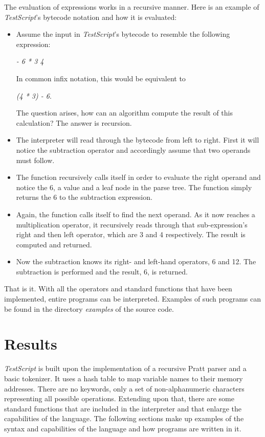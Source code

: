 \documentclass[12pt,a4paper]{article}
\newcommand{\expr}[1] {
    \begin{center}
        #1
    \end{center}
}
\newcommand{\name}{\emph{TestScript}}
\begin{document}
The evaluation of expressions works in a recursive manner. Here is an 
example of \name{}'s bytecode notation and how it is evaluated:
\begin{itemize}
    \item Assume the input in \name{}'s bytecode to resemble the following expression: 
        \expr{\emph{- 6 * 3 4}}
        In common infix notation, this would be equivalent to 
        \expr{\emph{(4 * 3) - 6}.}
        The question arises, how can an algorithm compute the result of this
        calculation? The answer is recursion.
    \item The interpreter will read through the bytecode from left to right. First it will
        notice the subtraction operator and accordingly assume that two
        operands must follow.
    \item The function recursively calls itself in order to evaluate the
        right operand and notice the 6, a value and a leaf node in the parse tree. 
        The function simply returns the 6 to the subtraction expression.
    \item Again, the function calls itself to find the next operand.
        As it now reaches a multiplication operator,
        it recursively reads through that sub-expression's right and then left
        operator, which are 3 and 4 respectively.
        The result is computed and returned.
    \item Now the subtraction knows its right- and left-hand operators, 6 and 12.
        The subtraction is performed and the result, 6, is returned.
\end{itemize}

That is it. With all the operators and standard functions that have been implemented, entire programs
can be interpreted. Examples of such programs can be found in the directory
\emph{examples} of the source code.

\section{Results}

\name{} is built upon the implementation of a recursive Pratt
parser and a basic tokenizer. It uses a hash table to map variable names to their
memory addresses. There are no keywords, only a set of non-alphanumeric characters
representing all possible operations. Extending upon that, there are some
standard functions that are included in the interpreter and that enlarge the capabilities of the language.
The following sections make up examples of the syntax and capabilities of the language and
how programs are written in it.
\end{document}

